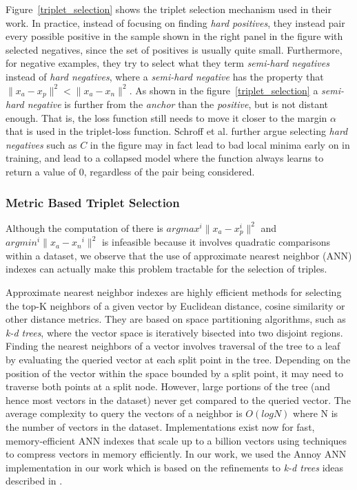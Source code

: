 Figure~\ref{triplet_selection} shows the triplet selection mechanism used in their work.  In practice, instead of focusing on finding \textit{hard positives}, they instead pair every possible positive in the sample shown in the right panel in the figure with selected negatives, since the set of positives is usually quite small.  Furthermore, for negative examples, they try to select what they term \textit{semi-hard negatives} instead of \textit{hard negatives}, where a \textit{semi-hard negative} has the property that $\|x_a - x_p \|^2 < \|x_a - x_n \|^2$.  As shown in the figure~\ref{triplet_selection} a \textit{semi-hard negative} is further from the \textit{anchor} than the \textit{positive}, but is not distant enough.  That is, the loss function still needs to move it closer to the margin $\alpha$ that is used in the triplet-loss function.  Schroff et al. further argue selecting \textit{hard negatives} such as $C$ in the figure may in fact lead to bad local minima early on in training, and lead to a collapsed model where the function always learns to return a value of 0, regardless of the pair being considered.

\subsubsection{Metric Based Triplet Selection}
Although the computation of there is $argmax^i \| x_{a} - x_{p}^i \|^2$ and $argmin^i \| x_{a} - x{_n}^i \|^2$ is infeasible because it involves quadratic comparisons within a dataset, we observe that the use of approximate nearest neighbor (ANN) indexes can actually make this problem tractable for the selection of triples.  

Approximate nearest neighbor indexes are highly efficient methods for selecting the top-K neighbors of a given vector by Euclidean distance, cosine similarity or other distance metrics.  They are based on space partitioning algorithms, such as \textit{k-d trees}, where the vector space is iteratively bisected into two disjoint regions.  Finding the nearest neighbors of a vector involves traversal of the tree to a leaf by evaluating the queried vector at each split point in the tree.  Depending on the position of the vector within the space bounded by a split point, it may need to traverse both points at a split node.  However, large portions of the tree (and hence most vectors in the dataset) never get compared to the queried vector.  The average complexity to query the vectors of a neighbor is $O(log N)$ where N is the number of vectors in the dataset.  Implementations exist now for fast, memory-efficient ANN indexes that scale up to a billion vectors \cite{JDH17} using techniques to compress vectors in memory efficiently.  In our work, we used the Annoy ANN implementation \cite{annoy_git} in our work which is based on the refinements to \textit{k-d trees} ideas described in \cite{annoy-paper}.

